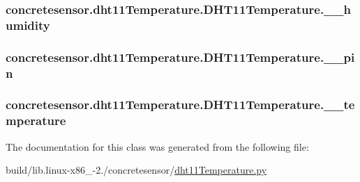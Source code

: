 \subsubsection[{\+\_\+\+\_\+humidity}]{\setlength{\rightskip}{0pt plus 5cm}concretesensor.\+dht11\+Temperature.\+D\+H\+T11\+Temperature.\+\_\+\+\_\+humidity\hspace{0.3cm}{\ttfamily [private]}}\label{classconcretesensor_1_1dht11Temperature_1_1DHT11Temperature_a84b7785a553936c541f6a5140e733870}
\hypertarget{classconcretesensor_1_1dht11Temperature_1_1DHT11Temperature_a45d47c9d3f17c9729ea76e4d3304d2e7}{}
\subsubsection[{\+\_\+\+\_\+pin}]{\setlength{\rightskip}{0pt plus 5cm}concretesensor.\+dht11\+Temperature.\+D\+H\+T11\+Temperature.\+\_\+\+\_\+pin\hspace{0.3cm}{\ttfamily [private]}}\label{classconcretesensor_1_1dht11Temperature_1_1DHT11Temperature_a45d47c9d3f17c9729ea76e4d3304d2e7}
\hypertarget{classconcretesensor_1_1dht11Temperature_1_1DHT11Temperature_ad862600604931d707c2d79477606a24b}{}
\subsubsection[{\+\_\+\+\_\+temperature}]{\setlength{\rightskip}{0pt plus 5cm}concretesensor.\+dht11\+Temperature.\+D\+H\+T11\+Temperature.\+\_\+\+\_\+temperature\hspace{0.3cm}{\ttfamily [private]}}\label{classconcretesensor_1_1dht11Temperature_1_1DHT11Temperature_ad862600604931d707c2d79477606a24b}


The documentation for this class was generated from the following file\+:\begin{DoxyCompactItemize}
\item 
build/lib.\+linux-\/x86\+\_-\/2./concretesensor/\hyperlink{build_2lib_8linux-x86__64-2_87_2concretesensor_2dht11Temperature_8py}{dht11\+Temperature.\+py}\end{DoxyCompactItemize}
